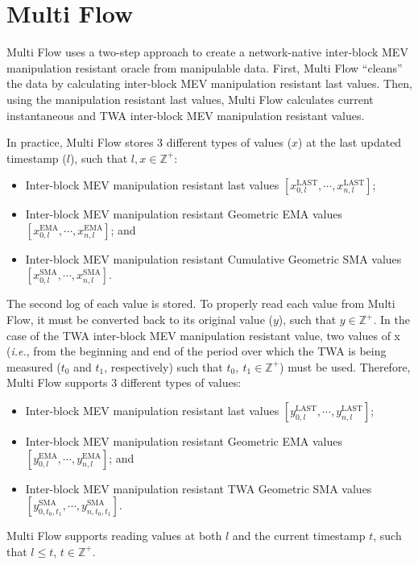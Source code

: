 \documentclass[tikz]{article}
\begin{document}
\section{Multi Flow}
Multi Flow uses a two-step approach to create a network-native inter-block MEV manipulation resistant oracle from manipulable data. First, Multi Flow “cleans” the data by calculating inter-block MEV manipulation resistant last values. Then, using the manipulation resistant last values, Multi Flow calculates current instantaneous and TWA inter-block MEV manipulation resistant values. 

In practice, Multi Flow stores 3 different types of values ($x$) at the last updated timestamp ($l$), such that $l, x \in \mathbb{Z}^{+}$:
\begin{itemize}
\item Inter-block MEV manipulation resistant last values $[x^{\text{LAST}}_{0,l}, \cdots, x^{\text{LAST}}_{n,l}]$;
\item Inter-block MEV manipulation resistant Geometric EMA values $[x^{\text{EMA}}_{0,l}, \cdots, x^{\text{EMA}}_{n,l}]$; and
\item Inter-block MEV manipulation resistant Cumulative Geometric SMA values $[x^{\text{SMA}}_{0,l}, \cdots, x^{\text{SMA}}_{n,l}]$.
\end{itemize}

The second log of each value is stored. To properly read each value from Multi Flow, it must be converted back to its original value ($y$), such that $y \in \mathbb{Z}^{+}$. In the case of the TWA inter-block MEV manipulation resistant value, two values of x (\textit{i.e.}, from the beginning and end of the period over which the TWA is being measured ($t_0$ and $t_1$, respectively) such that $t_0,\ t_1 \in \mathbb{Z}^{+}$) must be used. Therefore, Multi Flow supports 3 different types of values:
\begin{itemize}
\item Inter-block MEV manipulation resistant last values $[y^{\text{LAST}}_{0,l}, \cdots, y^{\text{LAST}}_{n,l}]$;
\item Inter-block MEV manipulation resistant Geometric EMA values $[y^{\text{EMA}}_{0,l}, \cdots, y^{\text{EMA}}_{n,l}]$; and
\item Inter-block MEV manipulation resistant TWA Geometric SMA values $[y^{\text{SMA}}_{0,t_0,t_1}, \cdots, y^{\text{SMA}}_{n,t_0,t_1}]$.
\end{itemize}

Multi Flow supports reading values at both $l$ and the current timestamp $t$, such that $l \leq t$, $t \in \mathbb{Z}^{+}$.
\end{document}
